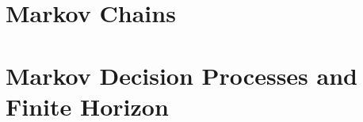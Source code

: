 \documentclass[12pt]{book}
\begin{document}
% 



% 


% 


% 

% 

\setcounter{chapter}{2}

\chapter{Markov Chains}
\label{chapter:MC}


\chapter{Markov Decision Processes and Finite Horizon}
\label{chapter:MDP-FH}



%

%
%
\end{document}
